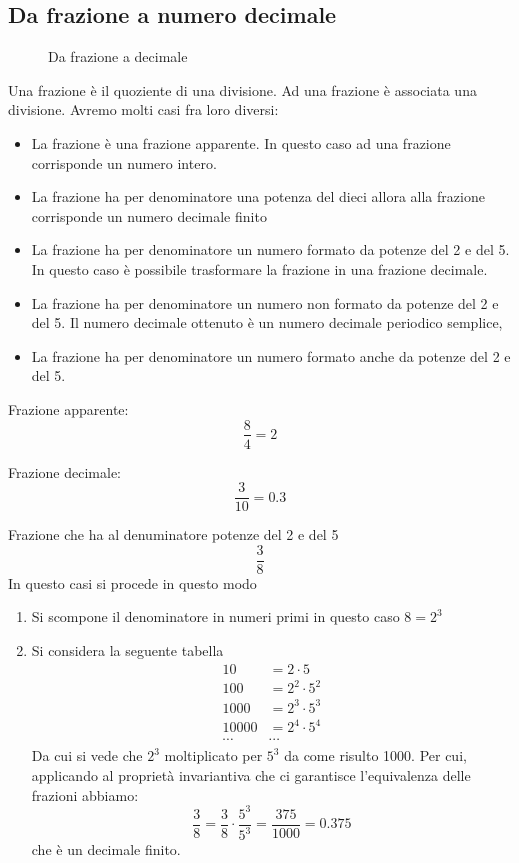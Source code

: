 \subsection{Da frazione a numero decimale}
\begin{figure}
	\centering
	
	\caption{Da frazione a decimale}
	\label{fig:DaFrazioniaDecimale}
\end{figure}
Una frazione è il quoziente di una divisione.  Ad una frazione è associata una divisione. Avremo molti casi fra loro diversi:
\begin{itemize}
	\item La frazione è una frazione apparente. In questo caso ad una frazione corrisponde un numero intero.
	\item La frazione ha per denominatore una potenza del dieci allora alla frazione corrisponde un numero decimale finito  
	\item La frazione ha per denominatore un numero formato da potenze del \num{2} e del \num{5}. In questo caso è possibile trasformare la frazione in una frazione decimale.
	\item La frazione ha per denominatore un numero non formato da potenze del \num{2} e del \num{5}. Il numero decimale ottenuto è un numero decimale periodico semplice, 
	\item La frazione ha per denominatore un numero formato anche da potenze del \num{2} e del \num{5}. 
\end{itemize}
\begin{esempio}
Frazione apparente: \[\dfrac{8}{4}=\num{2}\]
\end{esempio}
\begin{esempio}
Frazione decimale:\[\dfrac{3}{10}=\num{0.3}\]
\end{esempio}
	\begin{esempio}
	Frazione che ha al denuminatore potenze del \num{2} e del \num{5}
\[\dfrac{3}{8}\] In questo casi si procede in questo modo\begin{enumerate}
			\item Si scompone il denominatore in numeri primi in questo caso $8=2^3$
			\item Si considera la seguente tabella 
			\begin{align*}
			\num{10}&=2\cdot 5\\
			\num{100}&=2^2\cdot 5^2\\
			\num{1000}&=2^3\cdot 5^3\\
			\num{10000}&=2^4\cdot 5^4\\
			\cdots&\cdots
			\end{align*}
			Da cui si vede che $2^3$ moltiplicato per $5^3$ da come risulto \num{1000}. Per cui, applicando al proprietà invariantiva che ci garantisce l'equivalenza delle frazioni abbiamo:\[\dfrac{3}{8}=\dfrac{3}{8}\cdot\dfrac{5^3}{5^3}=\dfrac{375}{1000}=\num{0,375}\] che è un decimale finito.
		\end{enumerate}
	\end{esempio}
